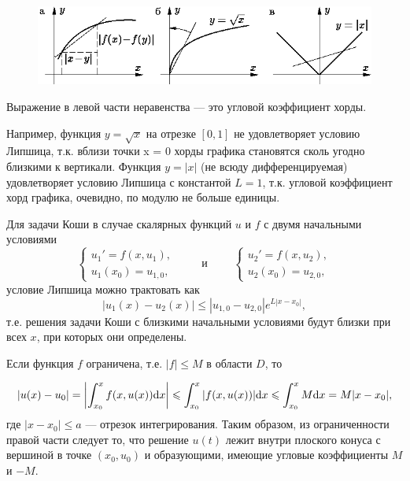\documentclass[12pt, a4paper]{article}
\begin{document}
\begin{enumerate}
		\begin{figure}[!h]
			\centering
			\includegraphics[width=0.7\linewidth]{lipshich}
			\label{lipshich}
		\end{figure}
		
		Выражение в левой части неравенства — это угловой коэффициент хорды.
		
		Например, функция $y = \sqrt{x}$ на отрезке $[0, 1]$ не удовлетворяет условию Липшица, т.к. вблизи точки x = 0 хорды графика становятся сколь угодно близкими к вертикали. Функция $y = |x|$ (не всюду дифференцируемая) удовлетворяет условию Липшица с константой $L = 1$, т.к. угловой коэффициент хорд графика, очевидно, по модулю не больше единицы.
		
		Для задачи Коши в случае скалярных функций $u$ и $f$ с двумя начальными условиями
		\[
		\begin{cases}
			u_1' = f(x, u_1), \\
			u_1(x_0) = u_{1,0},
		\end{cases} \qquad \textrm{ и } \qquad \begin{cases}
			u_2' = f(x, u_2), \\
			u_2(x_0) = u_{2,0},
		\end{cases}
		\]
		условие Липшица можно трактовать как
		\[
		|u_1(x) - u_2(x)| \le |u_{1,0} - u_{2,0}| e^{L |x-x_0|},
		\]
		т.е. решения задачи Коши с близкими начальными условиями будут близки при всех $x$, при которых они определены.
		
		Если функция $f$ ограничена, т.е. $|f| \le M$ в области $D$, то

		\[
		|u(x) - u_0| = \left|\int_{x_0}^{x} f(x, u(x)) \textup dx\right| \le \int_{x_0}^{x} |f(x, u(x))| \textup dx \le \int_{x_0}^{x} M \textup dx = M |x-x_0|,
		\]
		где $|x-x_0| \le a$ --- отрезок интегрирования. Таким образом, из ограниченности правой части следует то, что решение $u(t)$ лежит внутри плоского конуса с вершиной в точке $(x_0, u_0)$ и образующими, имеющие угловые коэффициенты $M$ и $-M$.
		

\end{enumerate}
\end{document}
